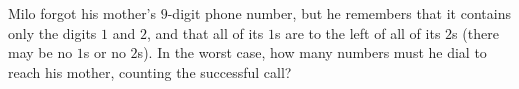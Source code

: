 Milo forgot his mother's $9$-digit phone number, but he remembers that it contains only the digits $1$ and $2$, and that all of its $1$s are to the left of all of its $2$s (there may be no $1$s or no $2$s). In the worst case, how many numbers must he dial to reach his mother, counting the successful call?
